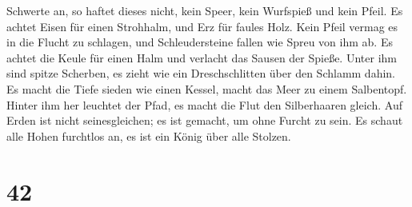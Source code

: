 Schwerte an, so haftet dieses nicht, kein Speer, kein Wurfspieß und kein
Pfeil.  Es achtet Eisen für einen Strohhalm, und Erz für
faules Holz.  Kein Pfeil vermag es in die Flucht zu
schlagen, und Schleudersteine fallen wie Spreu von ihm ab.
 Es achtet die Keule für einen Halm und verlacht das
Sausen der Spieße.  Unter ihm sind spitze Scherben, es
zieht wie ein Dreschschlitten über den Schlamm dahin.  Es
macht die Tiefe sieden wie einen Kessel, macht das Meer zu einem
Salbentopf.  Hinter ihm her leuchtet der Pfad, es macht
die Flut den Silberhaaren gleich.  Auf Erden ist nicht
seinesgleichen; es ist gemacht, um ohne Furcht zu sein. 
Es schaut alle Hohen furchtlos an, es ist ein König über alle Stolzen.

\hypertarget{section-41}{%
\section{42}\label{section-41}}


